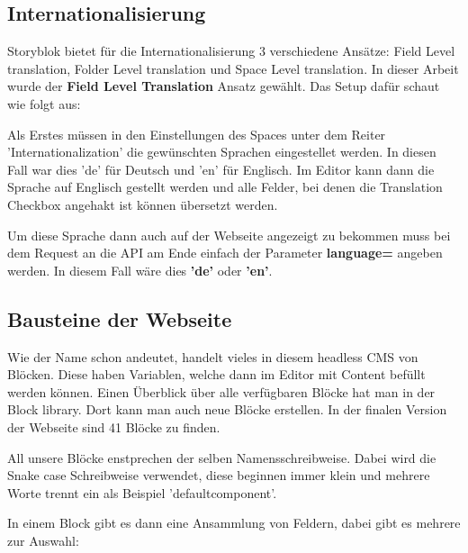 \subsection{Internationalisierung}
Storyblok bietet für die Internationalisierung 3 verschiedene Ansätze: Field Level translation, Folder Level translation und Space Level translation. 
In dieser Arbeit wurde der \textbf{Field Level Translation} Ansatz gewählt. 
Das Setup dafür schaut wie folgt aus:

Als Erstes müssen in den Einstellungen des Spaces unter dem Reiter 'Internationalization' die gewünschten Sprachen eingestellet werden. 
In diesen Fall war dies 'de' für Deutsch und 'en' für Englisch. 
Im Editor kann dann die Sprache auf Englisch gestellt werden und alle Felder, bei denen die Translation Checkbox angehakt ist können übersetzt werden. 

Um diese Sprache dann auch auf der Webseite angezeigt zu bekommen muss bei dem Request an die API am Ende einfach der Parameter \textbf{language=} angeben werden. 
In diesem Fall wäre dies \textbf{'de'} oder \textbf{'en'}.


\subsection{Bausteine der Webseite}
Wie der Name schon andeutet, handelt vieles in diesem headless CMS von Blöcken. Diese haben Variablen, welche dann im Editor mit Content befüllt werden können. 
Einen Überblick über alle verfügbaren Blöcke hat man in der Block library. Dort kann man auch neue Blöcke erstellen. In der finalen Version der Webseite sind 41 Blöcke zu finden. 

All unsere Blöcke enstprechen der selben Namensschreibweise. Dabei wird die Snake case Schreibweise verwendet, diese beginnen immer klein und mehrere Worte trennt ein \textunderscore  als Beispiel 'default\textunderscore component'.

In einem Block gibt es dann eine Ansammlung von Feldern, dabei gibt es mehrere zur Auswahl:


